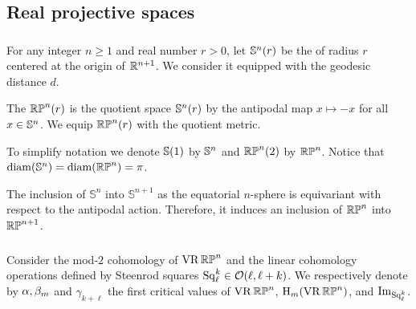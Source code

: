 
\subsection{Real projective spaces}
\label{sub:first_critical_value_rpn}

\subsubsection{}

For any integer $n \geq 1$ and real number $r > 0$, let $\mathbb{S}^n(r)$ be the  of radius $r$ centered at the origin of $\mathbb{R}^{n+1}$.
We consider it equipped with the geodesic distance $d$.

The  $\mathbb{RP}^n(r)$ is the quotient space $\mathbb{S}^n(r)$ by the antipodal map $x \mapsto -x$ for all $x \in \mathbb{S}^n$.
We equip $\mathbb{RP}^n(r)$ with the quotient metric.

To simplify notation we denote $\mathbb{S}(1)$ by $\mathbb{S}^n$ and $\mathbb{RP}^n(2)$ by $\mathbb{RP}^n$.
Notice that $\operatorname{diam}(\mathbb{S}^n) = \operatorname{diam}(\mathbb{RP}^n) = \pi$.

The inclusion of \(\mathbb{S}^n\) into \(\mathbb{S}^{n+1}\) as the equatorial $n$-sphere is equivariant with respect to the antipodal action.
Therefore, it induces an inclusion of \(\mathbb{RP}^n\) into \(\mathbb{RP}^{n+1}\).


\subsubsection{}\label{sub:barcode_rpn}

Consider the mod-\(2\) cohomology of \(\operatorname{VR}\mathbb{RP}^n\) and the linear cohomology operations defined by Steenrod squares \(\operatorname{Sq}^k_\ell \in \mathcal{O}(\ell,\ell+k)\).
We respectively denote by $\alpha, \beta_m$ and $\gamma_{k + \ell}$ the first critical values of \(\operatorname{VR}\mathbb{RP}^n\), \(\mathrm{H}_m(\operatorname{VR}\mathbb{RP}^n)\), and \(\operatorname{Im}_{\operatorname{Sq}^k_\ell}\).

